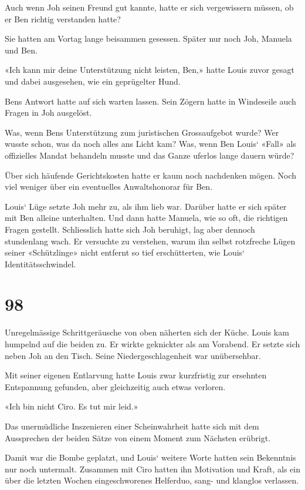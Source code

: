 Auch wenn Joh seinen Freund gut kannte, hatte er sich vergewissern
müssen, ob er Ben richtig verstanden hatte?

Sie hatten am Vortag lange beisammen gesessen. Später nur noch Joh,
Manuela und Ben.

«Ich kann mir deine Unterstützung nicht leisten, Ben,» hatte Louis zuvor
gesagt und dabei ausgesehen, wie ein geprügelter Hund.

Bens Antwort hatte auf sich warten lassen. Sein Zögern hatte in
Windeseile auch Fragen in Joh ausgelöst.

Was, wenn Bens Unterstützung zum juristischen Grossaufgebot wurde? Wer
wusste schon, was da noch alles ans Licht kam? Was, wenn Ben Louis`
«Fall» als offizielles Mandat behandeln musste und das Ganze uferlos
lange dauern würde?

Über sich häufende Gerichtskosten hatte er kaum noch nachdenken mögen.
Noch viel weniger über ein eventuelles Anwaltshonorar für Ben.

Louis` Lüge setzte Joh mehr zu, als ihm lieb war. Darüber hatte er sich
später mit Ben alleine unterhalten. Und dann hatte Manuela, wie so oft,
die richtigen Fragen gestellt. Schliesslich hatte sich Joh beruhigt, lag
aber dennoch stundenlang wach. Er versuchte zu verstehen, warum ihn
selbst rotzfreche Lügen seiner «Schützlinge» nicht entfernt so tief
erschütterten, wie Louis` Identitätsschwindel.

\chapter{98}\label{section-98}

Unregelmässige Schrittgeräusche von oben näherten sich der Küche. Louis
kam humpelnd auf die beiden zu. Er wirkte geknickter als am Vorabend. Er
setzte sich neben Joh an den Tisch. Seine Niedergeschlagenheit war
unübersehbar.

Mit seiner eigenen Entlarvung hatte Louis zwar kurzfristig zur ersehnten
Entspannung gefunden, aber gleichzeitig auch etwas verloren.

«Ich bin nicht Ciro. Es tut mir leid.»

Das unermüdliche Inszenieren einer Scheinwahrheit hatte sich mit dem
Aussprechen der beiden Sätze von einem Moment zum Nächsten erübrigt.

Damit war die Bombe geplatzt, und Louis` weitere Worte hatten sein
Bekenntnis nur noch untermalt. Zusammen mit Ciro hatten ihn Motivation
und Kraft, als ein über die letzten Wochen eingeschworenes Helferduo,
sang- und klanglos verlassen.

